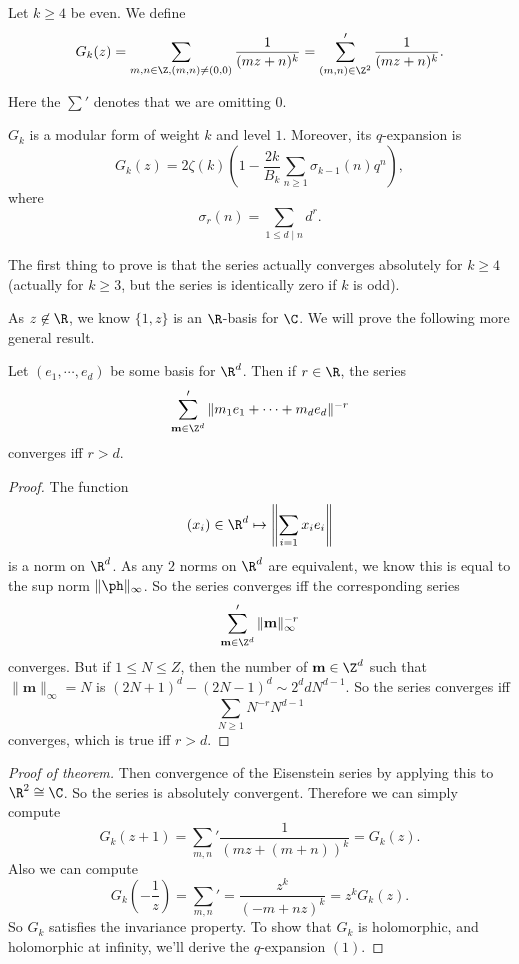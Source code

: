 \documentclass[a4paper]{article}
\begin{document}
\begin{defi}
  Let $k \geq 4$ be even. We define
  \[
    G_k(z) = \sum_{m, n \in \Z, (m, n) \not= (0, 0)} \frac{1}{(mz + n)^k} = \sum_{(m, n) \in \Z^2}' \frac{1}{(mz + n)^k}.
  \]
\end{defi}
Here the $\sum'$ denotes that we are omitting $0$.

\begin{thm}
  $G_k$ is a modular form of weight $k$ and level $1$. Moreover, its $q$-expansion is
  \[
    G_k(z) = 2 \zeta(k) \left(1 - \frac{2k}{B_k} \sum_{n \geq 1}  \sigma_{k - 1}(n) q^n\right),\tag{$1$}
  \]
  where
  \[
    \sigma_r(n) = \sum_{1 \leq d \mid n} d^r.
  \]
\end{thm}

The first thing to prove is that the series actually converges absolutely for $k \geq 4$ (actually for $k \geq 3$, but the series is identically zero if $k$ is odd).

As $z \not \in \R$, we know $\{1, z\}$ is an $\R$-basis for $\C$. We will prove the following more general result.
\begin{prop}
  Let $(e_1, \cdots, e_d)$ be some basis for $\R^d$. Then if $r \in \R$, the series
  \[
    \sum'_{\mathbf{m} \in \Z^d} \|m_1 e_1 + \cdots + m_d e_d\|^{-r}
  \]
  converges iff $r > d$.
\end{prop}

\begin{proof}
  The function
  \[
    (x_i) \in \R^d \mapsto \left\|\sum_{i = 1} x_i e_i \right\|
  \]
  is a norm on $\R^d$. As any $2$ norms on $\R^d$ are equivalent,  we know this is equal to the sup norm $\|\ph\|_\infty$. So the series converges iff the corresponding series
  \[
    \sum_{\mathbf{m} \in \Z^d}' \|\mathbf{m}\|_\infty^{-r}
  \]
  converges. But if $1 \leq N \leq Z$, then the number of $\mathbf{m} \in \Z^d$ such that $\|\mathbf{m}\|_\infty = N$ is $(2N + 1)^d - (2N - 1)^d \sim 2^d d N^{d - 1}$. So the series converges iff
  \[
    \sum_{N \geq 1} N^{-r} N^{d - 1}
  \]
  converges, which is true iff $r > d$.
\end{proof}

\begin{proof}[Proof of theorem]
  Then convergence of the Eisenstein series by applying this to $\R^2 \cong \C$. So the series is absolutely convergent. Therefore we can simply compute
  \[
    G_k(z + 1) = \sum_{m, n}' \frac{1}{(mz + (m + n))^k} = G_k(z).
  \]
  Also we can compute
  \[
    G_k\left(-\frac{1}{z}\right) = \sum_{m, n}' = \frac{z^k}{(-m + nz)^k} = z^k G_k(z).
  \]
  So $G_k$ satisfies the invariance property. To show that $G_k$ is holomorphic, and holomorphic at infinity, we'll derive the $q$-expansion $(1)$.
\end{proof}
\end{document}
